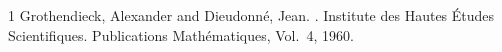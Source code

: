 \begin{thebibliography}{1}
Grothendieck, Alexander and Dieudonn{\'e}, Jean.
.
\newblock Institute des {H}autes {\'E}tudes {S}cientifiques.
\newblock Publications {M}ath{\'e}matiques, Vol.~4, 1960.
\end{thebibliography}
